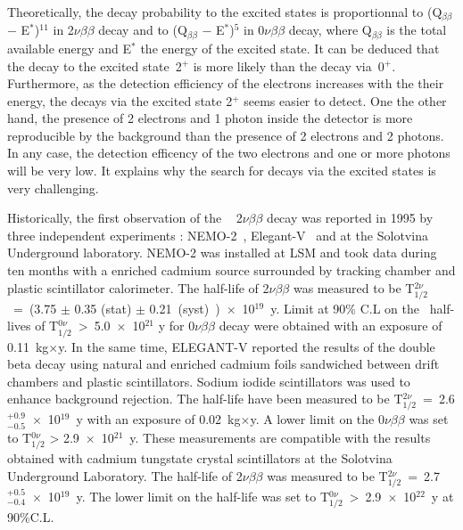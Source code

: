 \documentclass[main.tex]{subfiles}
\begin{document}
\NI Theoretically, the decay probability to the excited states is proportionnal to (Q$_{\beta\beta}$ $-$ E$^*$)$^{\text{11}}$ in 2$\nu\beta\beta$ decay and to (Q$_{\beta\beta}$ $-$ E$^*$)$^{\text{5}}$ in 0$\nu\beta\beta$ decay, where Q$_{\beta\beta}$ is the total available energy and E$^*$ the energy of the excited state. It can be deduced that the decay to the excited state~2$^+$ is more likely than the decay via~0$^+$. Furthermore, as the detection efficiency of the electrons increases with the their energy, the decays via the excited state 2$^+$ seems easier to detect. One the other hand, the presence of 2 electrons and 1 photon inside the detector is more reproducible by the background than the presence of 2 electrons and 2 photons. In any case, the detection efficency of the two electrons and one or more photons will be very low. It explains why the search for decays via the excited states is very challenging.


\bigskip


\NI Historically, the first observation of the \Cd~ 2$\nu\beta\beta$ decay was reported in 1995 by three independent experiments : NEMO-2~\cite{Barabash2010ie}, Elegant-V~\cite{ElegantV-1} and at the Solotvina Underground laboratory\cite{Aurora}. NEMO-2 was installed at LSM and took data during ten months with a enriched cadmium source surrounded by tracking chamber and plastic scintillator calorimeter. The half-life of 2$\nu\beta\beta$ was measured to be T$_{\text{1}/\text{2}}^{\text{2}\nu}$~=~(3.75 $\pm$ 0.35 (stat) $\pm$ 0.21~(syst)~)~$\times$~10$^{\text{19}}$~y. Limit at 90\% C.L on the \Cd~half-lives of T$_{\text{1}/\text{2}}^{\text{0}\nu}$~>~5.0~$\times$~10$^{\text{21}}$ y for 0$\nu\beta\beta$ decay were obtained with an exposure of 0.11~kg$\times$y. In the same time, ELEGANT-V reported the results of the double beta decay using natural and enriched cadmium foils sandwiched between drift chambers and plastic scintillators. Sodium iodide scintillators was used to enhance background rejection. The half-life have been measured to be T$_{\text{1}/\text{2}}^{\text{2}\nu}$~=~2.6 $^{+\text{0.9}}_{-\text{0.5}}$~$\times$~10$^{\text{19}}$~y with an exposure of 0.02~kg$\times$y. A lower limit on the 0$\nu\beta\beta$ was set to T$_{\text{1}/\text{2}}^{\text{0}\nu}$ > 2.9~$\times$~10$^{\text{21}}$~y. These measurements are compatible with the results obtained with cadmium tungstate crystal scintillators at the Solotvina Underground Laboratory.  The half-life of 2$\nu\beta\beta$ was measured to be T$_{\text{1}/\text{2}}^{\text{2}\nu}$~=~2.7$^{+\text{0.5}}_{-\text{0.4}}$~$\times$~10$^{\text{19}}$~y. The lower limit on the half-life was set to T$_{\text{1}/\text{2}}^{\text{0}\nu}$~>~2.9~$\times$~10$^{\text{22}}$~y at 90\%C.L. 
\end{document}
